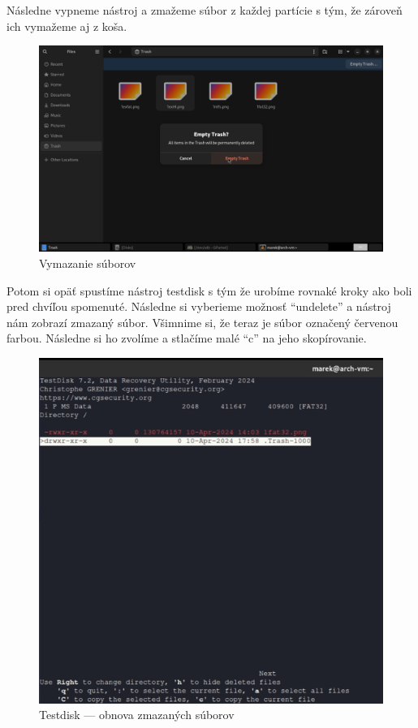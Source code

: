 \documentclass[12pt,oneside,slovak,a4paper]{article}
\begin{document}
Následne vypneme nástroj a zmažeme súbor z každej partície s tým, že zároveň ich vymažeme aj z koša.

\begin{figure}[H]
	\centering
	\includegraphics[width=\linewidth]{./images/testdisk_testing/file_deletion.png}
	\centering
	\captionsetup{justification=centering,margin=2cm}
	\caption{Vymazanie súborov}
\end{figure}

Potom si opäť spustíme nástroj testdisk s tým že urobíme rovnaké kroky ako boli pred chvíľou spomenuté. Následne si vyberieme možnosť ``undelete'' a nástroj nám zobrazí zmazaný súbor. Všimnime si, že teraz je súbor označený červenou farbou. Následne si ho zvolíme a stlačíme malé ``c'' na jeho skopírovanie.

\begin{figure}[H]
	\centering
	\includegraphics[scale=0.7]{./images/testdisk_testing/testdisk_deleted_file_recovery.png}
	\centering
	\captionsetup{justification=centering,margin=2cm}
	\caption{Testdisk --- obnova zmazaných súborov}
\end{figure}
\end{document}
